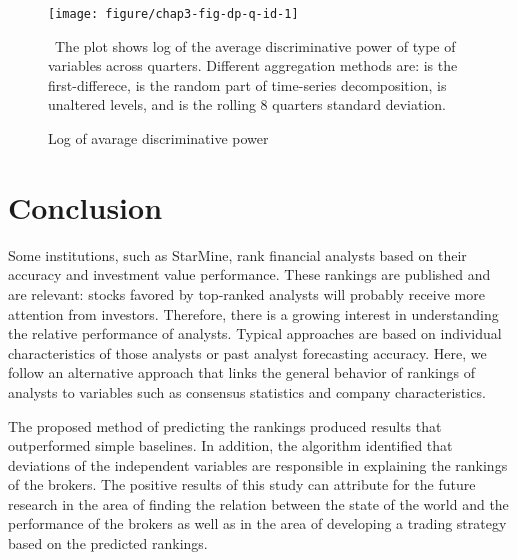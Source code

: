 \begin{figure}
\begin{knitrout}
\color{fgcolor}
\texttt{[image: figure/chap3-fig-dp-q-id-1]} 

\end{knitrout}
\caption{Log of avarage discriminative power}
\ The plot shows log of the average discriminative power of type of variables across quarters. Different aggregation methods are: \diff{} is the first-differece, \random{} is the random part of time-series decomposition, \raw{} is unaltered levels, and \rollsd{} is the rolling 8 quarters standard deviation.
\label{ch3-fig:time-dp}
\end{figure}



\section{Conclusion}
\label{ch3-sec:conclusion}
Some institutions, such as StarMine, rank financial analysts based on their accuracy and investment value performance. These rankings are published and are relevant: stocks favored by top-ranked analysts will probably receive more attention from investors. Therefore, there is a growing interest in understanding the relative performance of analysts. Typical approaches are based on individual characteristics of those analysts or past analyst forecasting accuracy. Here, we follow an alternative approach that links the general behavior of rankings of analysts to variables such as consensus statistics and company characteristics.

The proposed method of predicting the rankings produced  results that outperformed simple  baselines. In addition, the algorithm identified that deviations of the independent variables are responsible in explaining the rankings of the brokers. The positive results of this study can attribute for the future research in the area of finding the relation between the state of the world and the performance of the brokers as well as  in the area of developing a trading strategy based on the predicted rankings.
